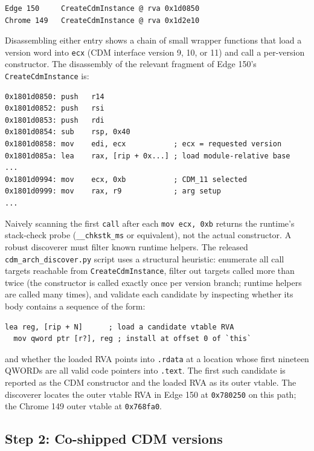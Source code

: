 \documentclass[11pt,letterpaper]{article}
\begin{document}
\begin{lstlisting}[basicstyle=\ttfamily\scriptsize]
Edge 150     CreateCdmInstance @ rva 0x1d0850
Chrome 149   CreateCdmInstance @ rva 0x1d2e10
\end{lstlisting}

Disassembling either entry shows a chain of small wrapper functions
that load a version word into \texttt{ecx} (CDM interface version 9,
10, or 11) and call a per-version constructor. The disassembly of
the relevant fragment of Edge 150's \texttt{CreateCdmInstance} is:

\begin{lstlisting}[basicstyle=\ttfamily\scriptsize]
0x1801d0850: push   r14
0x1801d0852: push   rsi
0x1801d0853: push   rdi
0x1801d0854: sub    rsp, 0x40
0x1801d0858: mov    edi, ecx           ; ecx = requested version
0x1801d085a: lea    rax, [rip + 0x...] ; load module-relative base
...
0x1801d0994: mov    ecx, 0xb           ; CDM_11 selected
0x1801d0999: mov    rax, r9            ; arg setup
...
\end{lstlisting}

Naively scanning the first \texttt{call} after each \texttt{mov ecx,
0xb} returns the runtime's stack-check probe (\texttt{\_\_chkstk\_ms}
or equivalent), not the actual constructor. A robust discoverer
must filter known runtime helpers. The released
\texttt{cdm\_arch\_discover.py} script uses a structural heuristic:
enumerate all call targets reachable from \texttt{CreateCdmInstance},
filter out targets called more than twice (the constructor is called
exactly once per version branch; runtime helpers are called many
times), and validate each candidate by inspecting whether its body
contains a sequence of the form:

\begin{lstlisting}[basicstyle=\ttfamily\scriptsize]
  lea reg, [rip + N]      ; load a candidate vtable RVA
  mov qword ptr [r?], reg ; install at offset 0 of `this`
\end{lstlisting}

\noindent and whether the loaded RVA points into \texttt{.rdata} at
a location whose first nineteen QWORDs are all valid code pointers
into \texttt{.text}. The first such candidate is reported as the
CDM constructor and the loaded RVA as its outer vtable. The
discoverer locates the outer vtable RVA in Edge 150 at
\texttt{0x780250} on this path; the Chrome 149 outer vtable at
\texttt{0x768fa0}.

\subsection{Step 2: Co-shipped CDM versions}
\label{sec:static-versions}
\end{document}
